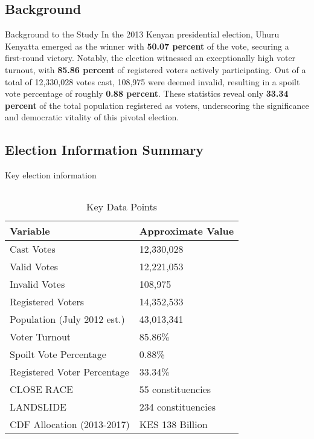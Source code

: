 \documentclass{beamer}
\begin{document}
\subsection{Background}

\begin{frame}{Background to the Study}
In the 2013 Kenyan presidential election, Uhuru Kenyatta emerged as the winner with \textbf{50.07 percent} of the vote, securing a first-round victory. Notably, the election witnessed an exceptionally high voter turnout, with \textbf{85.86 percent} of registered voters actively participating. Out of a total of 12,330,028 votes cast, 108,975 were deemed invalid, resulting in a spoilt vote percentage of roughly \textbf{0.88 percent}. These statistics reveal only \textbf{33.34 percent} of the total population registered as voters, underscoring the significance and democratic vitality of this pivotal election.
\end{frame}

\subsection{Election Information Summary}
\begin{frame}{Key election information}
\begin{columns}[c] %
\begin{table}
\centering
\begin{tabular}{|l|l|}
\hline
\textbf{Variable} & \textbf{Approximate Value} \\
\hline
Cast Votes & 12,330,028 \\
Valid Votes & 12,221,053 \\
Invalid Votes & 108,975 \\
Registered Voters & 14,352,533 \\
Population (July 2012 est.) & 43,013,341 \\
Voter Turnout & 85.86\% \\
Spoilt Vote Percentage & 0.88\% \\
Registered Voter Percentage & 33.34\% \\
CLOSE RACE & 55 constituencies \\
LANDSLIDE & 234 constituencies \\
CDF Allocation (2013-2017) & KES 138 Billion \\
\hline
\end{tabular}
\caption{Key Data Points}
\end{table}
\end{columns}
\end{frame}
\end{document}
